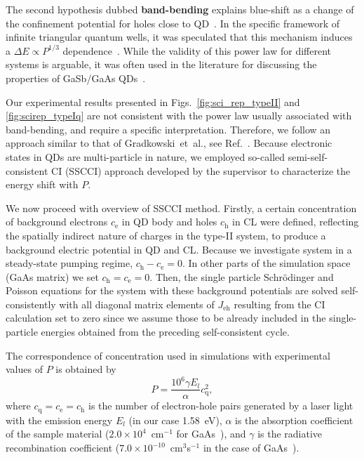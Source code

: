 The second hypothesis dubbed \textbf{band-bending} explains blue-shift as a change of the confinement potential for holes close to QD~\citep{LiuSteer,Jin,Hatami1998,Jo2012}. In the specific framework of infinite triangular quantum wells, it was speculated that this mechanism induces a $\Delta E \propto P^{1/3}$ dependence~\cite{Ledentsov1995,Kuokstis2002,Jo2012}. While the validity of this power law for different systems is arguable, it was often used in the literature for discussing the properties of GaSb/GaAs QDs~\cite{HATAMI1995,Hatami1998}.

Our experimental results presented in Figs.~\ref{fig:sci_rep_typeII} and \ref{fig:scirep_typeIq} are not consistent with the power law usually associated with band-bending, and require a specific interpretation. Therefore, we follow an approach similar to that of Gradkowski{~et~al}., see Ref.~\citep{Gradkowski2012}. Because electronic states in QDs are multi-particle in nature, we employed so-called semi-self-consistent CI (SSCCI) approach developed by the supervisor to characterize the energy shift with $P$.

We now proceed with overview of SSCCI method. Firstly, a certain concentration of background electrons $c_\mathrm{e}$ in QD body and holes $c_\mathrm{h}$ in CL were defined, reflecting the spatially indirect nature of charges in the type-II system, to produce a background electric potential in QD and CL. Because we investigate system in a steady-state pumping regime, $c_\mathrm{h}-c_\mathrm{e}=0$. In other parts of the simulation space (GaAs matrix) we set $c_\mathrm{h}=c_\mathrm{e}=0$. Then, the single particle Schrödinger and Poisson equations for the system with these background potentials are solved self-consistently with all diagonal matrix elements of $J_\mathrm{eh}$ resulting from the CI calculation set to zero since we assume those to be already included in the single-particle energies obtained from the preceding self-consistent cycle.

The correspondence of concentration used in simulations with experimental values of $P$ is obtained by~\cite{Kuokstis2002}
%
\begin{equation}
\label{eq:conc_to_P_recalc}
P=\frac{10^6\gamma E_{l}}{\alpha}c_\mathrm{q}^2,
\end{equation}
where $c_\mathrm{q}=c_\mathrm{e}=c_\mathrm{h}$ is the number of electron-hole pairs generated by a laser light with the emission energy $E_l$ (in our case 1.58~eV), $\alpha$ is the absorption coefficient of the sample material ($2.0\times 10^4$~cm$^{-1}$ for GaAs~\cite{landoltbornstein}), and $\gamma$ is the radiative recombination coefficient ($7.0\times 10^{-10}$~cm$^3$s$^{-1}$ in the case of GaAs~\cite{landoltbornstein}).

